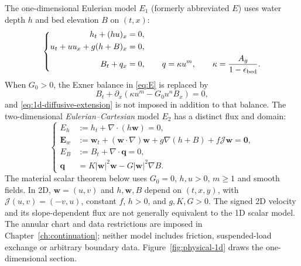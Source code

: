 \documentclass[12pt,a4paper,oneside]{report}
\numberwithin{equation}{chapter}
\theoremstyle{remark}\newtheorem{remark}[theorem]{Remark}
\begin{document}
The one-dimensional Eulerian model $E_1$ (formerly abbreviated $E$) uses
water depth $h$ and bed elevation $B$ on $(t,x)$:
\begin{equation}\label{eq:E}
\left\{\begin{aligned}
 h_t+(hu)_x&=0,\\
 u_t+uu_x+g(h+B)_x&=0,\\
 B_t+q_x&=0,\qquad q=\kappa u^m,\qquad \kappa=\frac{A_g}{1-\epsilon_{\rm bed}}.
\end{aligned}\right.
\end{equation}
When $G_0>0$, the Exner balance in \eqref{eq:E} is replaced by
\begin{equation}\label{eq:1d-diffusive-extension}
 B_t+\partial_x\!\left(\kappa u^m-G_0u^n B_x\right)=0,
\end{equation}
and \eqref{eq:1d-diffusive-extension} is not imposed in addition to that balance.
The two-dimensional \emph{Eulerian--Cartesian} model $E_2$ has a distinct
flux and domain:
\begin{equation}\label{eq:2d}
\left\{\begin{aligned}
 E_h&:=h_t+\nabla\cdot(h\mathbf w)=0,\\
 \mathbf E_w&:=\mathbf w_t+(\mathbf w\cdot\nabla)\mathbf w
       +g\nabla(h+B)+f\mathcal J\mathbf w=\mathbf 0,\\
 E_B&:=B_t+\nabla\cdot\mathbf q=0,\\
 \mathbf q&=K|\mathbf w|^2\mathbf w-G|\mathbf w|^2\nabla B.
\end{aligned}\right.
\end{equation}
The material scalar
theorem below uses $G_0=0$, $h,u>0$, $m\ge1$ and smooth fields. In 2D,
$\mathbf w=(u,v)$ and $h,\mathbf w,B$ depend on $(t,x,y)$, with
$\mathcal J(u,v)=(-v,u)$, constant $f$, $h>0$, and $g,K,G>0$.
The signed 2D velocity and its slope-dependent flux are not generally
equivalent to the 1D scalar model. The annular chart and data restrictions
are imposed in Chapter~\ref{ch:continuation}; neither model includes
friction, suspended-load exchange or arbitrary boundary data.
Figure~\ref{fig:physical-1d} draws the one-dimensional section.
\end{document}
